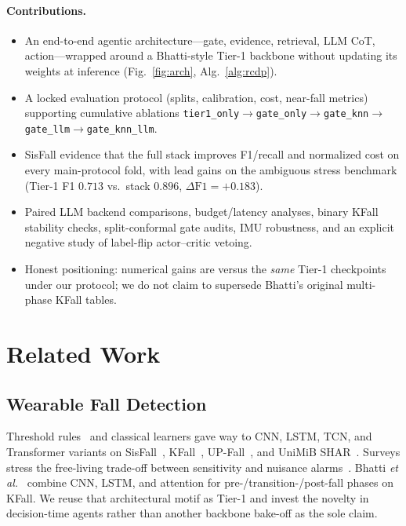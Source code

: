 \documentclass[journal]{IEEEtran}
\begin{document}
\paragraph{Contributions.}
\begin{itemize}
\item An end-to-end agentic architecture---gate, evidence, retrieval, LLM CoT, action---wrapped around a Bhatti-style Tier-1 backbone without updating its weights at inference (Fig.~\ref{fig:arch}, Alg.~\ref{alg:rcdp}).
\item A locked evaluation protocol (splits, calibration, cost, near-fall metrics) supporting cumulative ablations \texttt{tier1\_only}$\rightarrow$\texttt{gate\_only}$\rightarrow$\texttt{gate\_knn}$\rightarrow$\texttt{gate\_llm}$\rightarrow$\texttt{gate\_knn\_llm}.
\item SisFall evidence that the full stack improves F1/recall and normalized cost on every main-protocol fold, with lead gains on the ambiguous stress benchmark (Tier-1 F1 $0.713$ vs.\ stack $0.896$, $\Delta\text{F1}{=}+0.183$).
\item Paired LLM backend comparisons, budget/latency analyses, binary KFall stability checks, split-conformal gate audits, IMU robustness, and an explicit negative study of label-flip actor--critic vetoing.
\item Honest positioning: numerical gains are versus the \emph{same} Tier-1 checkpoints under our protocol; we do not claim to supersede Bhatti's original multi-phase KFall tables.
\end{itemize}

\section{Related Work}
\label{sec:related}

\subsection{Wearable Fall Detection}
Threshold rules~\cite{bourke2007threshold} and classical learners gave way to CNN, LSTM, TCN, and Transformer variants on SisFall~\cite{sisfall2017}, KFall~\cite{kfall2021}, UP-Fall~\cite{martinez2019upfall}, and UniMiB SHAR~\cite{micucci2017unimib}. Surveys stress the free-living trade-off between sensitivity and nuisance alarms~\cite{iglesias2019wearable,khan2017review,ren2021survey}. Bhatti \textit{et al.}~\cite{bhatti2025beyond} combine CNN, LSTM, and attention for pre-/transition-/post-fall phases on KFall. We reuse that architectural motif as Tier-1 and invest the novelty in decision-time agents rather than another backbone bake-off as the sole claim.
\end{document}
